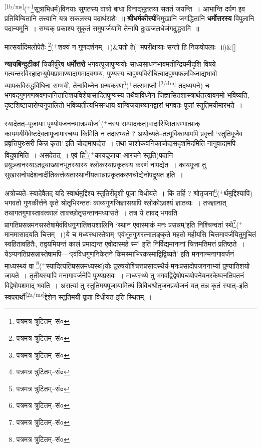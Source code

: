 \documentclass[article,12pt,a4paper]{memoir}
\newcommand{\add}[1]{($^{+}$#1)}
\begin{document}
	

	  \pstart \leavevmode\textsuperscript{\rmlatinfont\tiny [1b/ms]}\add{\footnote{पत्रमत्र त्रुटितम्--सं०}सूत्राभिधर्म}विनयाः सुगतस्य वाचो बाधा विनाद्भुततया सततं जयन्ति । आभान्ति दर्पण इव प्रतिबिम्बितानि तत्त्वानि यत्र सकलस्य पदार्थराशेः ॥ \textbf{श्रीधर्मकीर्त्त्य}भिमुखानि जगद्धितानि \textbf{धर्मोत्तरस्य} विपुलानि पदान्यमूनि । सम्यक् प्रकाश्य सुकृतं समुपार्जयामि तेनापि दुःखजलधेर्जगदुद्धरामि ॥
	\pend
      
	    
	    \stanza[\smallbreak]
मात्सर्यादिमलोपेतैः \footnote{पत्रमत्र त्रुटितम्--सं०}\add{शक्यं न गुणदर्शनम् ।}&यतो हे\add{मपरीक्षायाः सन्तो हि निकषोपलाः ॥}\&[\smallbreak]


	

	  \pstart \textbf{न्यायबिन्दुटीकां} चिकीर्षुरेष \textbf{धर्मोत्तरो} भगवत्पूजापुण्ययोः साध्यसाधनभावमतीन्द्रियमीदृशि विषये गत्यन्तरविरहादभ्युपेयप्रामाण्यादागमादवगम्य, पुण्यस्य चापुण्यविरोधित्वादपुण्यफलविध्नाद्यभावो व्यापकविरुद्धविधिना सम्भवी, तेनाविध्नेन ग्रन्थकरण\footnote{पत्रमत्र त्रुटितम्--सं०}\add{तत्समाप्तौ  \leavevmode\textsuperscript{\rmlatinfont\tiny [2/dm]} तदध्ययने} च भगवद्गुणगणश्रवणजनितातिशयविशेषासादितपुण्यस्य तथैवाविध्नेन जिज्ञासितशास्त्रार्थतत्त्वावगमो भविष्यति, दृष्टशिष्टाचारोप्यनुपालितो भविष्यतीत्यभिसन्धाय वाग्विजयाख्यानद्वारां भगवतः पूजां स्तुतिमयीमारभते ।
	\pend
      

	  \pstart स्यादेतत्--पूजायाः पुण्योपजननमात्रप्रयोज\footnote{पत्रमत्र त्रुटितम्--सं०}\add{नस्य सम्पादकत्}वादारिप्सितारम्भात्प्राक् कायमयीमेवेष्टदेवतापूजामारचय्य किमिति न तदारभ्यते ? अथोच्यते--तत्पूर्विकायामपि प्रवृत्तौ ‘स्तुतिपूजैव प्रवृत्तिपुरःसरी किन्न कृता’ इति चोद्यमापद्येत । तथा चाशोकवनिकाचोद्यसदृशमिदमिति नानुवाद्यमपि विदुषामिति । असदेतत् । एवं हि\footnote{पत्रमत्र त्रुटितम्--सं०}\add{कायपूजाया आरचने स्तुति}पदानि प्रयुञ्जानस्याऽतद्व्याख्यानभूतस्यास्य श्लोकस्याप्रकृतस्य करणं नापद्येत । कायपूजा तु सुखासनोपदेशनादीतिकर्त्तव्यतास्थानीयत्वान्नाप्रकृतकरणचोद्येनोपद्रूयत इति ।
	\pend
      

	  \pstart अत्रोच्यते--स्यादेवैतद् यदि स्वार्थमुद्दिश्य स्तुतिरीदृशी पूजा विधीयते । किं तर्हि ? श्रोतृजना\footnote{पत्रमत्र त्रुटितम्--सं०}\add{र्थमुद्दिश्यापि} भगवतो गुणकीर्त्तने कृते श्रोतृभिरन्ततः काव्यगुणजिज्ञासयापि श्लोकोऽवश्यं ज्ञातव्यः । तज्ज्ञानात् तथागतगुणास्तावत्कालं तावच्छोतृसन्तानमध्यासते । तत्र ये तावद् भगवति प्रागतिप्रसन्नमनसस्तेषामेवंविधगुणातिशयशालिनि ‘स्थान एवास्माकं मनः प्रसन्नम्’इति निश्चिन्वतां स्थे\footnote{पत्रमत्र त्रुटितम्--सं०}\add{मानमासादयति चित्तम् ।}ये च मध्यस्थास्तेषाम् ‘एवंभूतगुणरत्नालङ्कृते महतो महीयसि चित्तमावर्जयितुमुचितं स्वहितावहितैः, तद्वयमियन्तं कालं प्रमाद्यन्त एवोदास्महे स्म’ इति निर्विद्यमानानां चित्तमतिमत्तं प्रतिष्ठते । येऽप्यनतिप्रसन्नास्तेषामपि—‘एवंविधगुणनिकेतने किमस्माभिरकस्माद्विद्विष्यते’ इति मननान्मनागावर्जनं माध्यस्थ्यं वा \footnote{पत्रमत्र त्रुटितम्--सं०}\add{स्यादित्यतिप्रसन्नमध्यस्थ}योः पुरुषयोश्चित्तप्रसादस्थैर्य-मनःप्रसादोपजननाभ्यां पुण्यातिशयो जायते । तृतीयस्यापि मनागावर्जनेपि पुण्यप्रसवः । माध्यस्थ्ये तु भगवद्विद्वेषोपचयोपनेयनरकेष्वनतिपतनं विद्वेषोपशमाद् भवति । असत्यां तु स्तुतिमयपूजायामित्थं त्रिविधश्रोतृजनप्रयोजनं यत् तन्न कृतं स्यात्--इति स्वपरार्थो\leavevmode\textsuperscript{\rmlatinfont\tiny [2a/ms]}द्देशेन स्तुतिमयी पूजा विधीयत इति स्थितम् ।
	\pend
      
\end{document}

